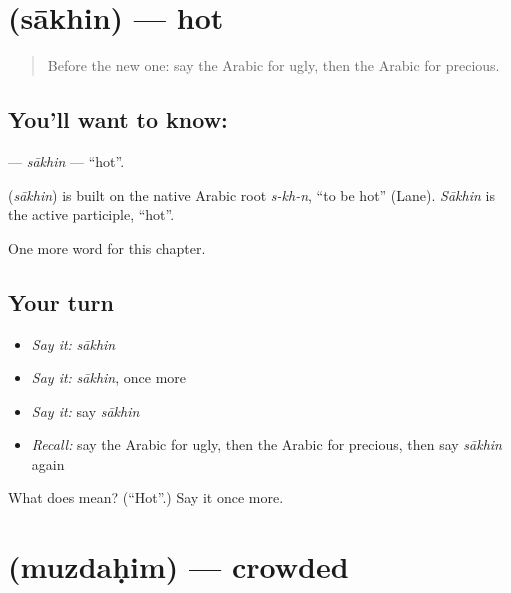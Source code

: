 \section[\texorpdfstring{\ar{ساخن} (sākhin)}{ساخن (sākhin)}]{ (sākhin) — hot}

\label{lesson:AR-C155-sakhin}



\begin{quote}
Before the new one: say the Arabic for ugly, then the Arabic for precious.
\end{quote}

\subsection*{You'll want to know: }
\textbf{} — \emph{sākhin} — \textquotedblleft{}hot\textquotedblright{}.

\begin{cousinweb}
\textbf{} (\emph{sākhin}) is built on the native Arabic root \emph{s-kh-n}, \textquotedblleft{}to be hot\textquotedblright{} (Lane). \emph{Sākhin} is the active participle, \textquotedblleft{}hot\textquotedblright{}.
\end{cousinweb}

\begin{grammarlens}[title={What you've built}]
One more word for this chapter.
\end{grammarlens}

\subsection*{Your turn}
\begin{itemize}
\raggedright
  \item \emph{Say it:} \emph{sākhin}
  \item \emph{Say it:} \emph{sākhin}, once more
  \item \emph{Say it:} say \emph{sākhin}
  \item \emph{Recall:} say the Arabic for ugly, then the Arabic for precious, then say \emph{sākhin} again
\end{itemize}

\begin{tcolorbox}[breakable,colback=teal!4,colframe=teal!35!black,title={Before you move on}]
What does  mean? (\textquotedblleft{}Hot\textquotedblright{}.) Say it once more.
\end{tcolorbox}
\section[\texorpdfstring{\ar{مزدحم} (muzdaḥim)}{مزدحم (muzdaḥim)}]{ (muzdaḥim) — crowded}

